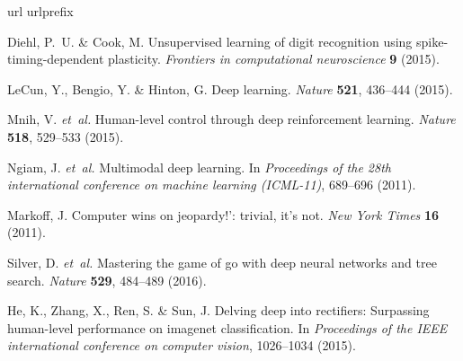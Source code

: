 \documentclass[journal, onecolumn]{IEEEtran}
\begin{document}
\begin{thebibliography}{10}
\expandafter\ifx\csname url\endcsname\relax
  \def\url#1{\texttt{#1}}\fi
\expandafter\ifx\csname urlprefix\endcsname\relax\def\urlprefix{URL }\fi
\providecommand{\bibinfo}[2]{#2}
\providecommand{\eprint}[2][]{\url{#2}}

\bibinfo{author}{Diehl, P.~U.} \& \bibinfo{author}{Cook, M.}
\newblock \bibinfo{title}{Unsupervised learning of digit recognition using
  spike-timing-dependent plasticity}.
\newblock \emph{\bibinfo{journal}{Frontiers in computational neuroscience}}
  \textbf{\bibinfo{volume}{9}} (\bibinfo{year}{2015}).

\bibinfo{author}{LeCun, Y.}, \bibinfo{author}{Bengio, Y.} \&
  \bibinfo{author}{Hinton, G.}
\newblock \bibinfo{title}{Deep learning}.
\newblock \emph{\bibinfo{journal}{Nature}} \textbf{\bibinfo{volume}{521}},
  \bibinfo{pages}{436--444} (\bibinfo{year}{2015}).

\bibinfo{author}{Mnih, V.} \emph{et~al.}
\newblock \bibinfo{title}{Human-level control through deep reinforcement
  learning}.
\newblock \emph{\bibinfo{journal}{Nature}} \textbf{\bibinfo{volume}{518}},
  \bibinfo{pages}{529--533} (\bibinfo{year}{2015}).

\bibinfo{author}{Ngiam, J.} \emph{et~al.}
\newblock \bibinfo{title}{Multimodal deep learning}.
\newblock In \emph{\bibinfo{booktitle}{Proceedings of the 28th international
  conference on machine learning (ICML-11)}}, \bibinfo{pages}{689--696}
  (\bibinfo{year}{2011}).

\bibinfo{author}{Markoff, J.}
\newblock \bibinfo{title}{Computer wins on jeopardy!’: trivial, it’s
  not}.
\newblock \emph{\bibinfo{journal}{New York Times}}
  \textbf{\bibinfo{volume}{16}} (\bibinfo{year}{2011}).

\bibinfo{author}{Silver, D.} \emph{et~al.}
\newblock \bibinfo{title}{Mastering the game of go with deep neural networks
  and tree search}.
\newblock \emph{\bibinfo{journal}{Nature}} \textbf{\bibinfo{volume}{529}},
  \bibinfo{pages}{484--489} (\bibinfo{year}{2016}).

\bibinfo{author}{He, K.}, \bibinfo{author}{Zhang, X.}, \bibinfo{author}{Ren,
  S.} \& \bibinfo{author}{Sun, J.}
\newblock \bibinfo{title}{Delving deep into rectifiers: Surpassing human-level
  performance on imagenet classification}.
\newblock In \emph{\bibinfo{booktitle}{Proceedings of the IEEE international
  conference on computer vision}}, \bibinfo{pages}{1026--1034}
  (\bibinfo{year}{2015}).


\end{thebibliography}
\end{document}
